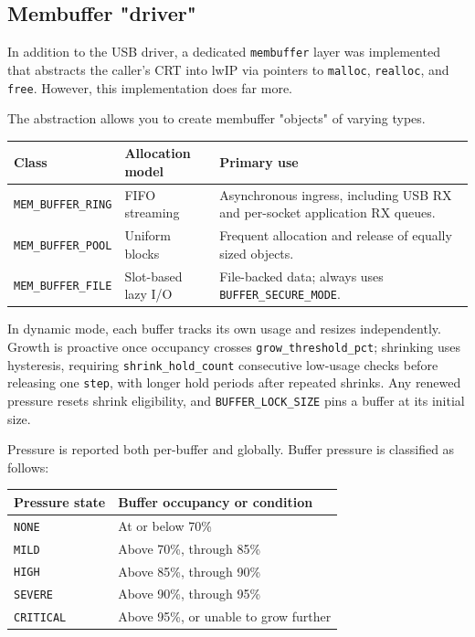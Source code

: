 \documentclass[titlepage]{report}
\begin{document}
		\subsection{Membuffer "driver"}
		\label{ssec:membuffer}
		In addition to the USB driver, a dedicated \texttt{membuffer} layer was implemented that abstracts the caller's CRT into lwIP via pointers to \texttt{malloc}, \texttt{realloc}, and \texttt{free}. However, this implementation does far more.

		The abstraction allows you to create membuffer "objects" of varying types.

		\begin{center}
			\footnotesize
			\begin{tabularx}{0.96\textwidth}{@{}>{\raggedright\arraybackslash}p{}>{\raggedright\arraybackslash}p{}X@{}}
				\toprule
				\rowcolor{gray!18}
				\textbf{Class} & \textbf{Allocation model} & \textbf{Primary use} \\
				\midrule
				\texttt{MEM\_BUFFER\_RING} & FIFO streaming & Asynchronous ingress, including USB RX and per-socket application RX queues. \\
				\texttt{MEM\_BUFFER\_POOL} & Uniform blocks & Frequent allocation and release of equally sized objects. \\
				\texttt{MEM\_BUFFER\_FILE} & Slot-based lazy I/O & File-backed data; always uses \texttt{BUFFER\_SECURE\_MODE}. \\
				\bottomrule
			\end{tabularx}
		\end{center}

		In dynamic mode, each buffer tracks its own usage and resizes independently. Growth is proactive once occupancy crosses \texttt{grow\_threshold\_pct}; shrinking uses hysteresis, requiring \texttt{shrink\_hold\_count} consecutive low-usage checks before releasing one \texttt{step}, with longer hold periods after repeated shrinks. Any renewed pressure resets shrink eligibility, and \texttt{BUFFER\_LOCK\_SIZE} pins a buffer at its initial size.

		Pressure is reported both per-buffer and globally. Buffer pressure is classified as follows:

		\begin{center}
			\footnotesize
			\begin{tabularx}{\textwidth}{@{}>{\raggedright\arraybackslash}p{}X@{}}
				\toprule
				\rowcolor{gray!18}
				\textbf{Pressure state} & \textbf{Buffer occupancy or condition} \\
				\midrule
				\texttt{NONE} & At or below 70\% \\
				\texttt{MILD} & Above 70\%, through 85\% \\
				\texttt{HIGH} & Above 85\%, through 90\% \\
				\texttt{SEVERE} & Above 90\%, through 95\% \\
				\texttt{CRITICAL} & Above 95\%, or unable to grow further \\
				\bottomrule
			\end{tabularx}
		\end{center}
\end{document}
